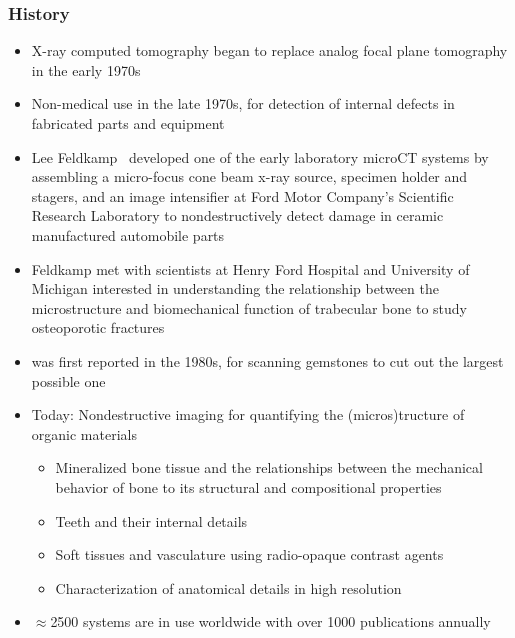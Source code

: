 \begin{frame}[allowframebreaks]
		\frametitle{\uct{} History}
		\begin{itemize}
				\item X-ray computed tomography began to replace analog focal plane tomography in the early 1970s~\cite{Lin2019}%
				\item Non-medical use in the late 1970s, for detection of internal defects in fabricated parts and equipment%
				\item Lee Feldkamp~\cite{Feldkamp1984} developed one of the early laboratory microCT systems by assembling a micro-focus cone beam x-ray source, specimen holder and stagers, and an image intensifier at Ford Motor Company’s Scientific Research Laboratory to nondestructively detect damage in ceramic manufactured automobile parts%
				\item Feldkamp met with scientists at Henry Ford Hospital and University of Michigan interested in understanding the relationship between the microstructure and biomechanical function of trabecular bone to study osteoporotic fractures~\cite{Feldkamp1983}%
				\item \uct{} was first reported in the 1980s, for scanning gemstones to cut out the largest possible one%
				\item Today: Nondestructive imaging for quantifying the (micros)tructure of organic materials%
						\begin{itemize}%
								\item Mineralized bone tissue and the relationships between the mechanical behavior of bone to its structural and compositional properties%
								\item Teeth and their internal details%
								\item Soft tissues and vasculature using radio-opaque contrast agents%
								\item Characterization of anatomical details in high resolution%
						\end{itemize}%
				\item \(\approx\)2500 \uct{} systems are in use worldwide with over 1000 publications annually%
		\end{itemize}
\end{frame}

